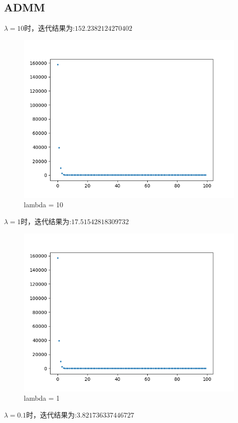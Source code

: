 \documentclass{xjtureport}
\begin{document}
\subsection{ADMM}
$\lambda = 10$时，迭代结果为:$152.2382124270402$
\begin{figure}[H]
    \centering
    \includegraphics[scale = 0.6]{figures/ADMM_lam=10.png}
    \caption{lambda = 10}
    \end{figure}
$\lambda = 1$时，迭代结果为:$17.51542818309732$
\begin{figure}[H]
    \centering
    \includegraphics[scale = 0.6]{figures/ADMM_lam=1.png}
    \caption{lambda = 1}
    \end{figure}
$\lambda = 0.1$时，迭代结果为:$3.821736337446727$
\end{document}
